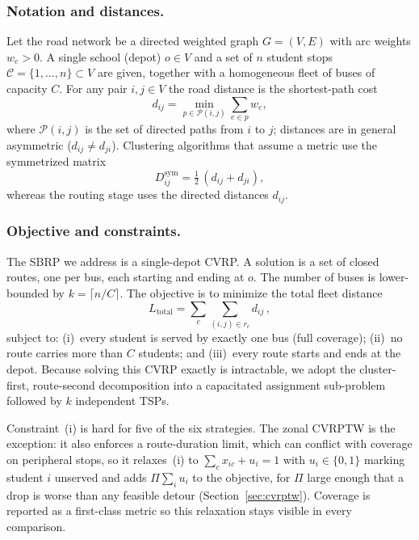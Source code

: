 \documentclass[runningheads]{llncs}
\begin{document}
\subsubsection{Notation and distances.}
Let the road network be a directed weighted graph $G=(V,E)$ with arc
weights $w_e>0$. A single school (depot) $o\in V$ and a set of
$n$ student stops $\mathcal{C}=\{1,\dots,n\}\subset V$ are given,
together with a homogeneous fleet of buses of capacity $C$. For any
pair $i,j\in V$ the road distance is the shortest-path cost
\begin{equation}
d_{ij}=\min_{p\in\mathcal{P}(i,j)}\sum_{e\in p} w_e ,
\end{equation}
where $\mathcal{P}(i,j)$ is the set of directed paths from $i$ to $j$;
distances are in general asymmetric ($d_{ij}\neq d_{ji}$). Clustering
algorithms that assume a metric use the symmetrized matrix
\begin{equation}
D^{\mathrm{sym}}_{ij}=\tfrac{1}{2}\,(d_{ij}+d_{ji}) ,
\end{equation}
whereas the routing stage uses the directed distances $d_{ij}$.

\subsubsection{Objective and constraints.}
The SBRP we address is a single-depot CVRP. A solution is a set of
closed routes, one per bus, each starting and ending at $o$. The
number of buses is lower-bounded by
$k=\lceil n/C\rceil$. The objective is to minimize the total fleet
distance
\begin{equation}
L_{\mathrm{total}}=\sum_{c}\sum_{(i,j)\in r_c} d_{ij}\,,
\label{eq:obj}
\end{equation}
subject to: (i)~every student is served by exactly one bus (full
coverage); (ii)~no route carries more than $C$ students; and
(iii)~every route starts and ends at the depot. Because solving this
CVRP exactly is intractable, we adopt the cluster-first, route-second
decomposition into a capacitated assignment sub-problem followed by
$k$ independent TSPs.

Constraint~(i) is hard for five of the six strategies. The zonal CVRPTW
is the exception: it also enforces a route-duration limit, which can
conflict with coverage on peripheral stops, so it relaxes~(i) to
$\sum_{c} x_{ic}+u_i=1$ with $u_i\in\{0,1\}$ marking student $i$
unserved and adds $\Pi\sum_i u_i$ to the objective, for $\Pi$ large
enough that a drop is worse than any feasible detour
(Section~\ref{sec:cvrptw}). Coverage is reported as a first-class
metric so this relaxation stays visible in every comparison.
\end{document}
